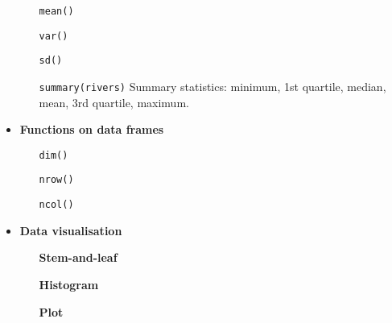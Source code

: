 \begin{itemize}
\begin{enumerate}
\item[\texttt{mean()}]
\item[\texttt{var()}]
\item[\texttt{sd()}]
\item[\texttt{summary(rivers)}] Summary statistics: minimum, 1st quartile, median, mean, 3rd quartile, maximum.
\end{enumerate}
\item \textbf{Functions on data frames}
\begin{enumerate}
\item[\texttt{dim()}]
\item[\texttt{nrow()}]
\item[\texttt{ncol()}]
\end{enumerate}
\item \textbf{Data visualisation}
\begin{itemize}
\item[\textbf{Stem-and-leaf}]
\item[\textbf{Histogram}]
\item[\textbf{Plot}]
\end{itemize}
\end{itemize}

